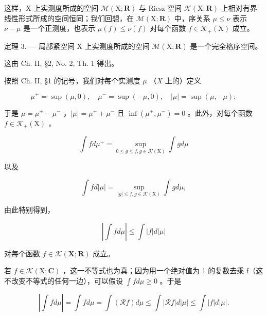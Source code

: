 这样，X 上实测度所成的空间 \(\mathcal{M}(\mathrm{X};\mathbf{R})\) 与 Riesz 空间 \(\mathcal{K}(\mathrm{X};\mathbf{R})\) 上相对有界线性形式所成的空间恒同；我们回想，在 \(\mathcal{M}(\mathrm{X};\mathbf{R})\) 中，序关系 \(\mu\leqslant\nu\) 表示 \(\nu-\mu\) 是一个正测度，也表示 \(\mu(f)\leqslant\nu(f)\) 对每个函数 \(f\in\mathcal{K}_{+}(\mathrm{X})\) 成立。

定理 3. --- 局部紧空间 X 上实测度所成的空间 \(\mathcal{M}(\mathrm{X};\mathbf{R})\) 是一个完全格序空间。

这由 Ch. II, §2, No. 2, Th. 1 得出。

按照 Ch. II, §1 的记号，我们对每个实测度 \(\mu\) （\(X\) 上的）定义

\[
\mu^ {+} = \sup (\mu , 0), \quad \mu^ {-} = \sup (- \mu , 0), \quad | \mu | = \sup (\mu , - \mu);
\]

于是 \(\mu = \mu^{+} - \mu^{-}\) ，\(|\mu| = \mu^{+} + \mu^{-}\) 且 \(\inf (\mu^{+},\mu^{-}) = 0\) 。此外，对每个函数 \(f\in \mathcal{K}_{+}(\mathrm{X})\) ，

\[
\int f d \mu^ {+} = \sup _ {0 \leqslant g \leqslant f, g \in \mathcal {K} (\mathrm{X})} \int g d \mu\tag{8}
\]

以及

\[
\int f d | \mu | = \sup _ {| g | \leqslant f, g \in \mathcal {K} (\mathrm{X})} \int g d \mu ,\tag{9}
\]

由此特别得到，

\[
\left| \int f d \mu \right| \leqslant \int | f | d | \mu |\tag{10}
\]

对每个函数 \(f \in \mathcal{K}(\mathbf{X};\mathbf{R})\) 成立。

若 \(f \in \mathcal{K}(\mathrm{X};\mathbf{C})\) ，这一不等式也为真；因为用一个绝对值为 1 的复数去乘 f（这不改变不等式的任何一边），可以假设 \(\int f d\mu \geqslant 0\) 。于是

\[
\left| \int f d \mu \right| = \int f d \mu = \int (\mathcal {R} f) d \mu \leqslant \int | \mathcal {R} f | d | \mu | \leqslant \int | f | d | \mu |.
\]

